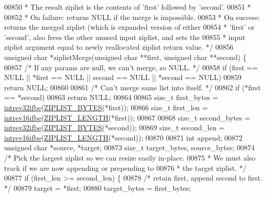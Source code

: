\begin{DoxyCode}
{{00850 \textcolor{comment}{ * The result ziplist is the contents of 'first' followed by 'second'.}
00851 \textcolor{comment}{ *}
00852 \textcolor{comment}{ * On failure: returns NULL if the merge is impossible.}
00853 \textcolor{comment}{ * On success: returns the merged ziplist (which is expanded version of either}
00854 \textcolor{comment}{ * 'first' or 'second', also frees the other unused input ziplist, and sets the}
00855 \textcolor{comment}{ * input ziplist argument equal to newly reallocated ziplist return value. */}
00856 \textcolor{keywordtype}{unsigned} \textcolor{keywordtype}{char} *ziplistMerge(\textcolor{keywordtype}{unsigned} \textcolor{keywordtype}{char} **first, \textcolor{keywordtype}{unsigned} \textcolor{keywordtype}{char} **second) \{
00857     \textcolor{comment}{/* If any params are null, we can't merge, so NULL. */}
00858     \textcolor{keywordflow}{if} (first == NULL || *first == NULL || second == NULL || *second == NULL)
00859         \textcolor{keywordflow}{return} NULL;
00860 
00861     \textcolor{comment}{/* Can't merge same list into itself. */}
00862     \textcolor{keywordflow}{if} (*first == *second)
00863         \textcolor{keywordflow}{return} NULL;
00864 
00865     size\_t first\_bytes = \hyperlink{endianconv_8h_a4e85d9ae58a3b1e6ceaabfd4689002c7}{intrev32ifbe}(\hyperlink{ziplist_8c_a28b9c7884758bc2d52f204903a4bb642}{ZIPLIST\_BYTES}(*first));
00866     size\_t first\_len = \hyperlink{endianconv_8h_a47540b5867d4cb1e322e83eaf2b50b56}{intrev16ifbe}(\hyperlink{ziplist_8c_a6d779e84aca736e354768fcf87393b98}{ZIPLIST\_LENGTH}(*first));
00867 
00868     size\_t second\_bytes = \hyperlink{endianconv_8h_a4e85d9ae58a3b1e6ceaabfd4689002c7}{intrev32ifbe}(\hyperlink{ziplist_8c_a28b9c7884758bc2d52f204903a4bb642}{ZIPLIST\_BYTES}(*second));
00869     size\_t second\_len = \hyperlink{endianconv_8h_a47540b5867d4cb1e322e83eaf2b50b56}{intrev16ifbe}(\hyperlink{ziplist_8c_a6d779e84aca736e354768fcf87393b98}{ZIPLIST\_LENGTH}(*second));
00870 
00871     \textcolor{keywordtype}{int} append;
00872     \textcolor{keywordtype}{unsigned} \textcolor{keywordtype}{char} *source, *target;
00873     size\_t target\_bytes, source\_bytes;
00874     \textcolor{comment}{/* Pick the largest ziplist so we can resize easily in-place.}
00875 \textcolor{comment}{     * We must also track if we are now appending or prepending to}
00876 \textcolor{comment}{     * the target ziplist. */}
00877     \textcolor{keywordflow}{if} (first\_len >= second\_len) \{
00878         \textcolor{comment}{/* retain first, append second to first. */}
00879         target = *first;
00880         target\_bytes = first\_bytes;
}}
\end{DoxyCode}
